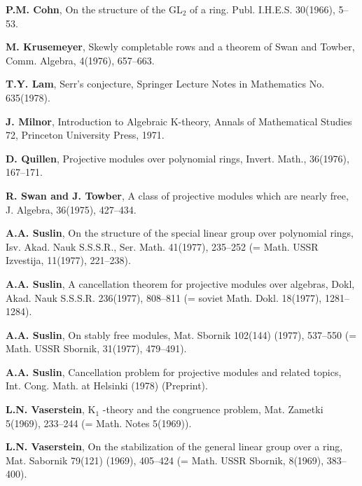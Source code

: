 \begin{thebibliography}{ABCDEFGHI}
\textbf{P.M. Cohn}, On the structure of the GL$_2$ of a
ring. Publ. I.H.E.S. 30(1966), 5--53.

\textbf{M. Krusemeyer}, Skewly completable rows and a theorem of Swan and
Towber, Comm. Algebra, 4(1976), 657--663.

\textbf{T.Y. Lam}, Serr's conjecture, Springer Lecture Notes in
Mathematics No. 635(1978).

\textbf{J. Milnor}, Introduction to Algebraic K-theory, Annals of
Mathematical Studies 72, Princeton University Press, 1971.

\textbf{D. Quillen}, Projective modules over polynomial rings,
Invert. Math., 36(1976), 167--171.

\textbf{R. Swan and J. Towber}, A class of projective modules which
are nearly free, J. Algebra, 36(1975), 427--434.

\textbf{A.A. Suslin}, On the structure of the special linear group
over polynomial rings, Isv. Akad. Nauk S.S.S.R., Ser. Math. 41(1977),
235--252 (= Math. USSR Izvestija, 11(1977), 221--238).

\textbf{A.A. Suslin}, A cancellation theorem for projective modules
over algebras, Dokl, Akad. Nauk S.S.S.R. 236(1977), 808--811 (= soviet
Math. Dokl. 18(1977), 1281--1284).

\textbf{A.A. Suslin}, On stably free modules, Mat. Sbornik 102(144)
(1977), 537--550 (= Math. USSR Sbornik, 31(1977), 479--491).

\textbf{A.A. Suslin}, Cancellation problem for projective modules and
related topics, Int. Cong. Math. at Helsinki (1978) (Preprint).

\textbf{L.N. Vaserstein}, K$_1$ -theory and the congruence problem,
Mat. Zametki 5(1969), 233--244 (= Math. Notes 5(1969)).

\textbf{L.N. Vaserstein}, On the stabilization of the general linear
group over a ring, Mat. Sabornik 79(121) (1969), 405--424 (=
Math. USSR Sbornik, 8(1969), 383--400).
\end{thebibliography}
